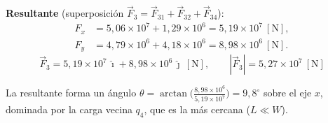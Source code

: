 \documentclass[12pt,letterpaper]{article}
\begin{document}
\noindent\textbf{Resultante} (superposici\'on $\vec F_3 = \vec F_{31}+\vec F_{32}+\vec F_{34}$):
\begin{align*}
    F_x &= 5{,}06\times10^{7} + 1{,}29\times10^{6} = 5{,}19\times10^{7}\ [\text{N}],\\[2pt]
    F_y &= 4{,}79\times10^{6} + 4{,}18\times10^{6} = 8{,}98\times10^{6}\ [\text{N}].
\end{align*}
\[
    \boxed{\vec F_3 = 5{,}19\times10^{7}\,\hat\imath + 8{,}98\times10^{6}\,\hat\jmath\ [\text{N}],
    \qquad |\vec F_3| = 5{,}27\times10^{7}\ [\text{N}]}
\]

\noindent La resultante forma un \'angulo
$\theta = \arctan\!\big(\tfrac{8{,}98\times10^{6}}{5{,}19\times10^{7}}\big) = 9{,}8^\circ$ sobre el eje $x$,
dominada por la carga vecina $q_4$, que es la m\'as cercana ($L\ll W$).
\end{document}
